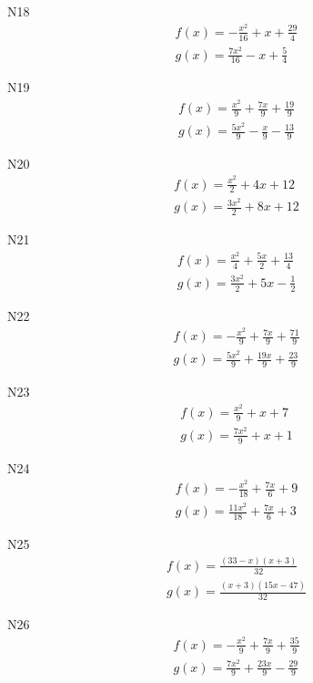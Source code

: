 \documentclass[11pt]{report}
\begin{document}
N18
\begin{align*}
 f(x) = - \frac{x^{2}}{16} + x + \frac{29}{4}\\
 g(x) = \frac{7 x^{2}}{16} - x + \frac{5}{4}
\end{align*}

N19
\begin{align*}
 f(x) = \frac{x^{2}}{9} + \frac{7 x}{9} + \frac{19}{9}\\
 g(x) = \frac{5 x^{2}}{9} - \frac{x}{9} - \frac{13}{9}
\end{align*}

N20
\begin{align*}
 f(x) = \frac{x^{2}}{2} + 4 x + 12\\
 g(x) = \frac{3 x^{2}}{2} + 8 x + 12
\end{align*}

N21
\begin{align*}
 f(x) = \frac{x^{2}}{4} + \frac{5 x}{2} + \frac{13}{4}\\
 g(x) = \frac{3 x^{2}}{2} + 5 x - \frac{1}{2}
\end{align*}

N22
\begin{align*}
 f(x) = - \frac{x^{2}}{9} + \frac{7 x}{9} + \frac{71}{9}\\
 g(x) = \frac{5 x^{2}}{9} + \frac{19 x}{9} + \frac{23}{9}
\end{align*}

N23
\begin{align*}
 f(x) = \frac{x^{2}}{9} + x + 7\\
 g(x) = \frac{7 x^{2}}{9} + x + 1
\end{align*}

N24
\begin{align*}
 f(x) = - \frac{x^{2}}{18} + \frac{7 x}{6} + 9\\
 g(x) = \frac{11 x^{2}}{18} + \frac{7 x}{6} + 3
\end{align*}

N25
\begin{align*}
 f(x) = \frac{\left(33 - x\right) \left(x + 3\right)}{32}\\
 g(x) = \frac{\left(x + 3\right) \left(15 x - 47\right)}{32}
\end{align*}

N26
\begin{align*}
 f(x) = - \frac{x^{2}}{9} + \frac{7 x}{9} + \frac{35}{9}\\
 g(x) = \frac{7 x^{2}}{9} + \frac{23 x}{9} - \frac{29}{9}
\end{align*}
\end{document}
